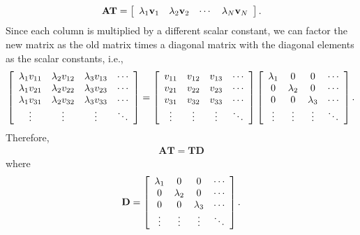 \begin{align}
  \mathbf{A} \mathbf{T} = \left[ \begin{array}{c c c c} \lambda_1 \mathbf{v}_1 & \lambda_2 \mathbf{v}_2 & \cdots & \lambda_N \mathbf{v}_N \end{array} \right] .
\end{align}
Since each column is multiplied by a different scalar constant, we can factor the new matrix as the old matrix times a diagonal matrix with the diagonal elements as the scalar constants, i.e.,
\begin{align}
  \left[ \begin{array}{c c c c}
  \lambda_1 v_{11} & \lambda_2 v_{12} & \lambda_3 v_{13} & \cdots \\
  \lambda_1 v_{21} & \lambda_2 v_{22} & \lambda_3 v_{23} & \cdots \\
  \lambda_1 v_{31} & \lambda_2 v_{32} & \lambda_3 v_{33} & \cdots \\  
            \vdots &           \vdots &           \vdots & \ddots \\\end{array} \right] =           
  \left[ \begin{array}{c c c c}
  v_{11} & v_{12} & v_{13} & \cdots \\
  v_{21} & v_{22} & v_{23} & \cdots \\
  v_{31} & v_{32} & v_{33} & \cdots \\  
  \vdots & \vdots & \vdots & \ddots \\ \end{array} \right]
  \left[ \begin{array}{c c c c}
  \lambda_1 &         0 &         0 & \cdots \\
          0 & \lambda_2 &         0 & \cdots \\
          0 &         0 & \lambda_3 & \cdots \\  
  \vdots & \vdots & \vdots & \ddots \\ \end{array} \right] .
\end{align}
Therefore,
\begin{align}
  \mathbf{AT} = \mathbf{TD}
\end{align}
where
\begin{align}
  \mathbf{D} =
  \left[ \begin{array}{c c c c}
  \lambda_1 &         0 &         0 & \cdots \\
          0 & \lambda_2 &         0 & \cdots \\
          0 &         0 & \lambda_3 & \cdots \\  
  \vdots & \vdots & \vdots & \ddots \\ \end{array} \right] .  
\end{align}

